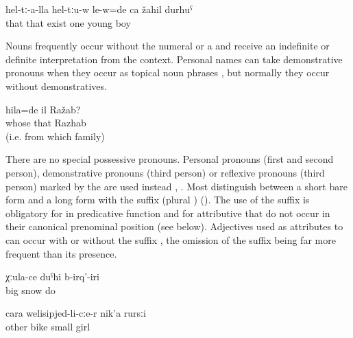 \begin{exe}
	\ex	\label{ex:There with them was also a / one young boy@2}
	\gll	hel-tː-a-lla	hel-tːu-w	le-w=de	ca	žahil	durħuˁ\\
		that	that	exist	one	young	boy\\
	\glt	{} 
\end{exe}

Nouns frequently occur without the numeral  or a  and receive an indefinite or definite interpretation from the context. Personal names can take demonstrative pronouns when they occur as topical noun phrases , but normally they occur without demonstratives.

\begin{exe}
	\ex	\label{ex:Whose was that Razhab@3}
	\gll	hila=de	il	Ražab?\\
		whose	that	Razhab\\
	\glt	{} (i.e. from which family)
\end{exe}

There are no special possessive pronouns. Personal pronouns (first and second person), demonstrative pronouns (third person) or reflexive pronouns (third person) marked by the  are used instead , . Most  distinguish between a short bare form and a long form with the suffix  (plural ) (). The use of the suffix is obligatory for  in predicative function and for attributive  that do not occur in their canonical prenominal position (see  below). Adjectives used as attributes to  can occur with  or without the suffix , the omission of the suffix being far more frequent than its presence.

\begin{exe}

		\ex	\label{ex:It snowed a lot@4a}
		\gll	χːula-ce	duˁħi	b-irq'-iri\\
			big	snow	do\\
		\glt	{}
	
		\ex	\label{ex:another little girl on a bike@4b}
		\gll	cara	welisipjed-li-cːe-r	nik'a	rursːi\\
			other	bike	small	girl\\
		\glt	{}

\end{exe}

